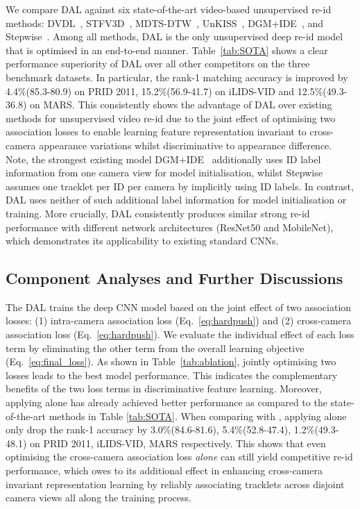 \documentclass{bmvc2k}
\begin{document}
\vspace{0.1em}
We compare DAL against six state-of-the-art video-based unsupervised
re-id methods: DVDL~\cite{karanam2015person},
STFV3D~\cite{liu2015spatio}, MDTS-DTW~\cite{ma2017person},
UnKISS~\cite{khan2016unsupervised}, DGM+IDE~\cite{ye2017dynamic}, and
Stepwise~\cite{liu2017stepwise}.  
Among all methods, DAL is the only unsupervised deep re-id model that is optimised in an end-to-end manner.
Table~\ref{tab:SOTA} shows a clear performance superiority of DAL
over all other competitors on the three benchmark datasets.
In particular, the rank-1 matching accuracy is improved by 4.4\%(85.3-80.9) on PRID 2011, 15.2\%(56.9-41.7) on iLIDS-VID and 12.5\%(49.3-36.8) on MARS. 
This consistently shows the advantage of DAL
over existing methods for unsupervised video re-id
due to the joint effect of optimising two association losses to 
enable learning feature representation 
invariant to cross-camera appearance variations whilst discriminative to appearance difference. 
Note, 
the strongest existing model DGM+IDE~\cite{ye2017dynamic} additionally
uses ID label information from one camera view for model initialisation, 
whilst Stepwise~\cite{liu2017stepwise} assumes one tracklet per ID per
camera by implicitly using ID labels.
In contrast, DAL uses neither of
such additional label information for model initialisation or training. 
More crucially, DAL consistently produces similar strong re-id performance with
different network architectures (ResNet50 and MobileNet), 
which demonstrates its applicability to existing standard CNNs.


\vspace{-0.2cm}
\subsection{Component Analyses and Further Discussions}
The DAL trains the deep CNN model based on the joint effect of two association losses: 
(1) intra-camera association loss  (Eq.~\eqref{eq:hardpush}) and 
(2) cross-camera association loss  (Eq.~\eqref{eq:hardpush}).
We evaluate the individual effect of each loss term by eliminating the other term 
from the overall learning objective (Eq.~\eqref{eq:final_loss}). 
As shown in Table~\ref{tab:ablation}, jointly optimising two losses leads
to the best model performance. 
This indicates the complementary benefits of the two loss terms in discriminative feature learning.
Moreover, applying  alone has already achieved better 
performance as compared to the state-of-the-art methods in Table \ref{tab:SOTA}.
When comparing with , applying  alone
only drop the rank-1 accuracy by 3.0\%(84.6-81.6), 5.4\%(52.8-47.4),
1.2\%(49.3-48.1) on PRID 2011, iLIDS-VID, MARS respectively. This
shows that even optimising the cross-camera association loss {\em alone} 
can still yield competitive re-id performance, 
which owes to its additional effect in enhancing cross-camera invariant representation learning 
by reliably associating tracklets across disjoint camera views
all along the training process. 
\end{document}

